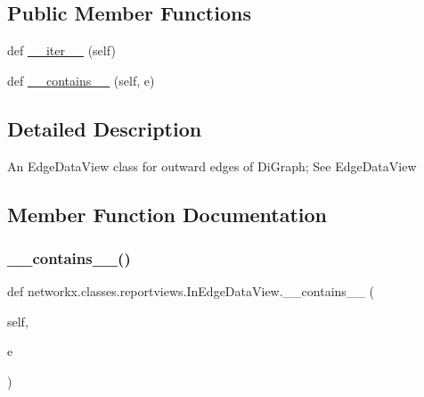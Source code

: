 \subsection*{Public Member Functions}
\begin{DoxyCompactItemize}
\item 
def \hyperlink{classnetworkx_1_1classes_1_1reportviews_1_1InEdgeDataView_aadae32c2d678955aa4abdcacdfb59eab}{\+\_\+\+\_\+iter\+\_\+\+\_\+} (self)
\item 
def \hyperlink{classnetworkx_1_1classes_1_1reportviews_1_1InEdgeDataView_a36e1e16f981801af9d321d89da53f891}{\+\_\+\+\_\+contains\+\_\+\+\_\+} (self, e)
\end{DoxyCompactItemize}


\subsection{Detailed Description}
\begin{DoxyVerb}An EdgeDataView class for outward edges of DiGraph; See EdgeDataView\end{DoxyVerb}
 

\subsection{Member Function Documentation}
\mbox{\label{classnetworkx_1_1classes_1_1reportviews_1_1InEdgeDataView_a36e1e16f981801af9d321d89da53f891}} 
\subsubsection{\texorpdfstring{\+\_\+\+\_\+contains\+\_\+\+\_\+()}{\_\_contains\_\_()}}
{\footnotesize\ttfamily def networkx.\+classes.\+reportviews.\+In\+Edge\+Data\+View.\+\_\+\+\_\+contains\+\_\+\+\_\+ (\begin{DoxyParamCaption}\item[{}]{self,  }\item[{}]{e }\end{DoxyParamCaption})}

